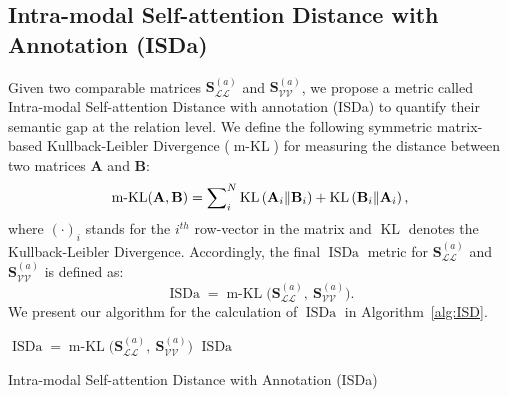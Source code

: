 \documentclass[11pt,a4paper]{article}
\begin{document}
\subsection{Intra-modal Self-attention Distance with Annotation (ISDa)}
\label{subsec:ISD}
Given two comparable matrices $\mathbf{S}_{\mathcal{LL}}^{(a)}$ and $\mathbf{S}_{\mathcal{VV}}^{(a)}$, we propose a metric called Intra-modal Self-attention Distance with annotation (ISDa) to quantify their semantic gap at the relation level. 
We define the following symmetric matrix-based Kullback-Leibler Divergence ($\operatorname{m-KL}$) for measuring the distance between two matrices $\mathbf{A}$ and $\mathbf{B}$:
\begin{equation}
\small
    \operatorname{m-KL}(\mathbf{A}, \mathbf{B})=\sum\nolimits_i^N \operatorname{KL}\left( \mathbf{A}_i \| \mathbf{B}_i \right) + \operatorname{KL}\left( \mathbf{B}_i \| \mathbf{A}_i \right),
    \label{equ:m-KL}
\end{equation}
where $(\cdot)_i$ stands for the $i^{th}$ row-vector in the matrix and $\operatorname{KL}$ denotes the Kullback-Leibler Divergence. 
Accordingly, the final $\operatorname{ISDa}$ metric for $\mathbf{S}_{\mathcal{LL}}^{(a)}$ and $\mathbf{S}_{\mathcal{VV}}^{(a)}$ is defined as:
\begin{equation}
    \operatorname{ISDa} = \operatorname{m-KL} \Big ( \mathbf{S}_{\mathcal{LL}}^{(a)}, ~ \mathbf{S}_{\mathcal{VV}}^{(a)} \Big ).
\label{equ:ISD}
\end{equation}
We present our algorithm for the calculation of $\operatorname{ISDa}$ in Algorithm~\ref{alg:ISD}.
\newcommand\mycommfont[1]{\small\ttfamily{#1}}
\begin{algorithm}[t]
\small
\DontPrintSemicolon
{}
$\operatorname{ISDa} = \operatorname{m-KL} \Big ( \mathbf{S}_{\mathcal{LL}}^{(a)}, ~ \mathbf{S}_{\mathcal{VV}}^{(a)} \Big )$ 
\Return $\operatorname{ISDa}$
\caption{Intra-modal Self-attention Distance with Annotation (ISDa)}
\label{alg:ISD}
\end{algorithm}
\end{document}
